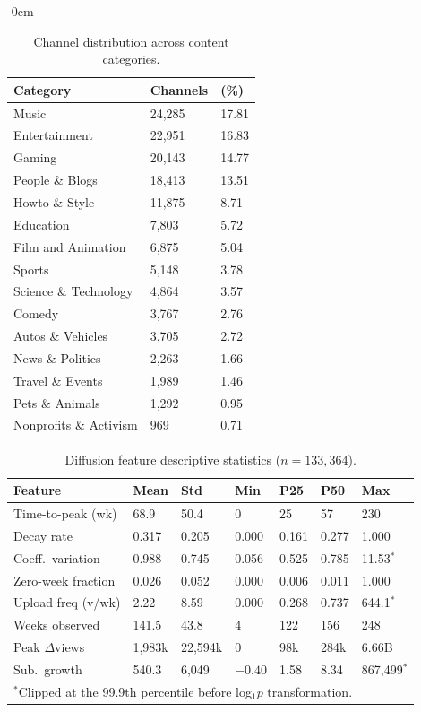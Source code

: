 \documentclass[journal,article,submit,pdftex,moreauthors]{Definitions/mdpi}
\begin{document}
\begin{adjustwidth}{-\extralength}{0cm}
\begin{table}[H]
\caption{Channel distribution across content categories.
\label{tab:categories}}
\begin{tabularx}{\textwidth}{lll}
\toprule
\textbf{Category} & \textbf{Channels} & \textbf{(\%)} \\
\midrule
Music               & 24,285 & 17.81 \\
Entertainment       & 22,951 & 16.83 \\
Gaming              & 20,143 & 14.77 \\
People \& Blogs     & 18,413 & 13.51 \\
Howto \& Style      & 11,875 &  8.71 \\
Education           &  7,803 &  5.72 \\
Film and Animation  &  6,875 &  5.04 \\
Sports              &  5,148 &  3.78 \\
Science \& Technology& 4,864 &  3.57 \\
Comedy              &  3,767 &  2.76 \\
Autos \& Vehicles   &  3,705 &  2.72 \\
News \& Politics    &  2,263 &  1.66 \\
Travel \& Events    &  1,989 &  1.46 \\
Pets \& Animals     &  1,292 &  0.95 \\
Nonprofits \& Activism & 969 &  0.71 \\
\bottomrule
\end{tabularx}
\end{table}

\begin{table}[H]
\caption{Diffusion feature descriptive statistics
($n = 133{,}364$).\label{tab:diffusion}}
\begin{tabularx}{\textwidth}{lllllll}
\toprule
\textbf{Feature}&\textbf{Mean}&\textbf{Std}&\textbf{Min}&
\textbf{P25}&\textbf{P50}&\textbf{Max}\\
\midrule
Time-to-peak (wk)  & 68.9  & 50.4  & 0     & 25    & 57    & 230 \\
Decay rate         & 0.317 & 0.205 & 0.000 & 0.161 & 0.277 & 1.000 \\
Coeff.\ variation  & 0.988 & 0.745 & 0.056 & 0.525 & 0.785 & 11.53$^*$ \\
Zero-week fraction & 0.026 & 0.052 & 0.000 & 0.006 & 0.011 & 1.000 \\
Upload freq (v/wk) & 2.22  & 8.59  & 0.000 & 0.268 & 0.737 & 644.1$^*$ \\
Weeks observed     & 141.5 & 43.8  & 4     & 122   & 156   & 248 \\
Peak $\Delta$views & 1,983k& 22,594k& 0    & 98k   & 284k  & 6.66B \\
Sub.\ growth       & 540.3 & 6,049 & $-0.40$& 1.58 & 8.34  & 867,499$^*$ \\
\bottomrule
\multicolumn{7}{l}{\footnotesize $^*$Clipped at the 99.9th percentile
before log$_{1}p$ transformation.}
\end{tabularx}
\end{table}


\end{adjustwidth}
\end{document}
